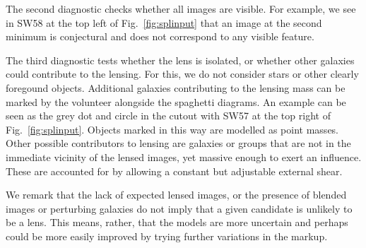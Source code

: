 The second diagnostic checks whether all images are visible.  For example,
we see in SW58 at the top left of Fig.~\ref{fig:splinput} that an
image at the second minimum is conjectural and does not correspond to
any visible feature.

The third diagnostic tests whether the lens is isolated, or whether
other galaxies could contribute to the lensing.  For this, we do not
consider stars or other clearly foregound objects.  Additional
galaxies contributing to the lensing mass can be marked by the
volunteer alongside the spaghetti diagrams.  An example can be seen as
the grey dot and circle in the cutout with SW57 at the top right of
Fig.~\ref{fig:splinput}.  Objects marked in this way are modelled as
point masses.  Other possible contributors to lensing are galaxies or
groups that are not in the immediate vicinity of the lensed images,
yet massive enough to exert an influence. These are accounted for by
allowing a constant but adjustable external shear.

We remark that the lack of expected lensed images, or the presence of
blended images or perturbing galaxies do not imply that a given
candidate is unlikely to be a lens.  This means, rather, that the
models are more uncertain and perhaps could be more easily improved by
trying further variations in the markup.

